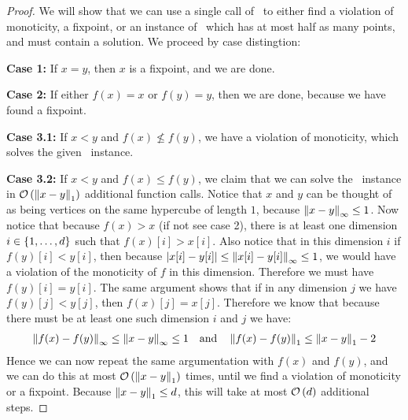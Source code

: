 \begin{proof}
    We will show that we can use a single call of \Tarskistar\ to either find a violation of monoticity, a fixpoint, or an instance of \Tarski\ which has at most half as many points, and must contain a solution. We proceed by case distingtion:

    \textbf{Case 1:} If $x=y$, then $x$ is a fixpoint, and we are done.

    \textbf{Case 2:} If either $f(x) = x$ or $f(y) = y$, then we are done, because we have found a fixpoint.

    \textbf{Case 3.1:} If $x < y$ and $f(x) \not\leq f(y)$, we have a violation of monoticity, which solves the given \Tarski\ instance.

    \textbf{Case 3.2:} If $x < y$ and $f(x) \leq f(y)$, we claim that we can solve the \Tarski\ instance in $\mathcal{O}\left(\left\lVert x - y\right\rVert_{1}\right)$ additional function calls. Notice that $x$ and $y$ can be thought of as being vertices on the same hypercube of length $1$, because $\left\lVert x-y\right\rVert_{\infty} \leq 1$. Now notice that because $f(x) > x$ (if not see case 2), there is at least one dimension $i \in \left\{1, \dots, d\right\}$ such that $f(x)[i] > x[i]$. Also notice that in this dimension $i$ if $f(y)[i] < y[i]$, then because $\left\lvert x[i] - y[i]\right\rvert \leq \left\lVert x[i] - y[i]\right\rVert_{\infty} \leq 1$, we would have a violation of the monoticity of $f$ in this dimension. Therefore we must have $f(y)[i] = y[i]$. The same argument shows that if in any dimension $j$ we have $f(y)[j] < y[j]$, then $f(x)[j] = x[j]$. Therefore we know that because there must be at least one such dimension $i$ and $j$ we have:
    \begin{align*}
        \left\lVert f(x) - f(y)\right\rVert_{\infty} \leq \left\lVert x - y\right\rVert_{\infty} \leq 1 \quad \text{and} \quad \left\lVert f(x) - f(y)\right\rVert_{1} \leq \left\lVert x - y\right\rVert_{1} - 2
    \end{align*}
    Hence we can now repeat the same argumentation with $f(x)$ and $f(y)$, and we can do this at most $\mathcal{O}\left(\left\lVert x - y\right\rVert_{1}\right)$ times, until we find a violation of monoticity or a fixpoint. Because $\left\lVert x - y\right\rVert_{1} \leq d$, this will take at most $\mathcal{O}\left(d\right)$ additional steps.


\end{proof}
